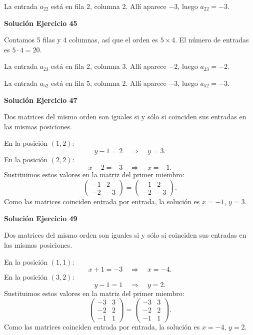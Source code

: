 \documentclass[12pt]{article}
\begin{document}
La entrada $a_{22}$ está en fila 2, columna 2. Allí aparece $-3$, luego $\boxed{a_{22}=-3}$.


\par\bigskip\noindent\textbf{Solución Ejercicio 45}\par\nobreak
Contamos 5 filas y 4 columnas, así que el orden es $5\times4$. El número de entradas es $5\cdot 4=20$.

La entrada $a_{23}$ está en fila 2, columna 3. Allí aparece $-2$, luego $\boxed{a_{23}=-2}$.

La entrada $a_{52}$ está en fila 5, columna 2. Allí aparece $-3$, luego $\boxed{a_{52}=-3}$.


\par\bigskip\noindent\textbf{Solución Ejercicio 47}\par\nobreak
Dos matrices del mismo orden son iguales si y sólo si coinciden sus entradas en las mismas posiciones.

En la posición $(1,2)$:
\[
y - 1=2\quad\Longrightarrow\quad y=3.
\]
En la posición $(2,2)$:
\[
x - 2=-3\quad\Longrightarrow\quad x=-1.
\]
Sustituimos estos valores en la matriz del primer miembro:
\[
\begin{pmatrix}-1&2\\-2&-3\end{pmatrix}=\begin{pmatrix}-1&2\\-2&-3\end{pmatrix}.
\]
Como las matrices coinciden entrada por entrada, la solución es $x=-1$, $y=3$.


\par\bigskip\noindent\textbf{Solución Ejercicio 49}\par\nobreak
Dos matrices del mismo orden son iguales si y sólo si coinciden sus entradas en las mismas posiciones.

En la posición $(1,1)$:
\[
x + 1=-3\quad\Longrightarrow\quad x=-4.
\]
En la posición $(3,2)$:
\[
y - 1=1\quad\Longrightarrow\quad y=2.
\]
Sustituimos estos valores en la matriz del primer miembro:
\[
\begin{pmatrix}-3&3\\-2&2\\-1&1\end{pmatrix}=\begin{pmatrix}-3&3\\-2&2\\-1&1\end{pmatrix}.
\]
Como las matrices coinciden entrada por entrada, la solución es $x=-4$, $y=2$.
\end{document}
